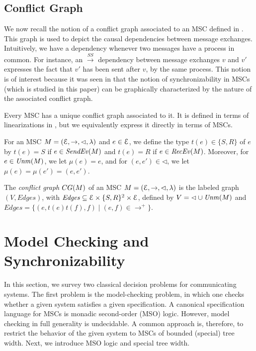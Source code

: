 \documentclass[a4paper,UKenglish,cleveref, autoref, thm-restate]{lipics-v2021}
\begin{document}
\subsection{Conflict Graph}

We now recall the notion of a conflict graph associated to an MSC defined in \cite{DBLP:conf/cav/BouajjaniEJQ18}. This graph is used to depict the causal dependencies between message exchanges.  Intuitively, we have a dependency whenever
two messages have a process in common. For instance, an $\xrightarrow{SS}$
dependency between message exchanges $v$ and $v'$ expresses the fact that
$v'$ has been sent after $v$, by the same process. This notion is of interest because it was seen in \cite{DBLP:conf/cav/BouajjaniEJQ18} that the notion of synchronizability in MSCs (which is studied in this paper) can be graphically characterized by the nature of the associated conflict graph.

Every MSC has a unique
conflict graph associated to it. It is defined in terms of linearizations
in \cite{DBLP:conf/fossacs/GiustoLL20}, but we equivalently express it
directly in terms of MSCs.

\newcommand{\type}{t}
\newcommand{\stype}{S}
\newcommand{\rtype}{R}
\newcommand{\mexch}{\mu}
\newcommand{\Edges}{\mathit{Edges}}

For an MSC $M = (\mathcal{E}, \rightarrow, \lhd, \lambda)$ and
$e \in \mathcal{E}$, we define the type $\type(e) \in \{\stype,\rtype\}$ of $e$ by $\type(e) = \stype$ if $e \in \mathit{SendEv}(M)$
and $\type(e) = \rtype$ if $e \in \mathit{RecEv}(M)$.
Moreover, for $e \in \mathit{Unm}(M)$, we let $\mexch(e) = e$,
and for $(e,e') \in \lhd$, we let $\mexch(e) = \mexch(e') = (e,e')$.


\begin{definition}
	The \emph{conflict graph} $\cgraph{\msc}$ of an MSC $M = (\mathcal{E}, \rightarrow, \lhd, \lambda)$ is the labeled graph $(V, \Edges)$, with $\Edges \subseteq \Events \times \{\stype,\rtype\}^2 \times \Events$, defined by
	$V = {\lhd} \cup \mathit{Unm}(M)$ and $\Edges = \{(e,\type(e)\type(f),f) \mid (e,f) \in {\to^+}\}$.
\end{definition}


\section{Model Checking and Synchronizability}

In this section, we survey two classical decision problems
for communicating systems.
The first problem is the model-checking problem, in which
one checks whether a given system satisfies a given
specification. A canonical specification language for MSCs is
monadic second-order (MSO) logic.
However, model checking in full generality is undecidable.
A common approach is, therefore, to restrict the behavior of
the given system to MSCs of bounded (special) tree width.
%
Next, we introduce MSO logic and special tree width.
\end{document}
